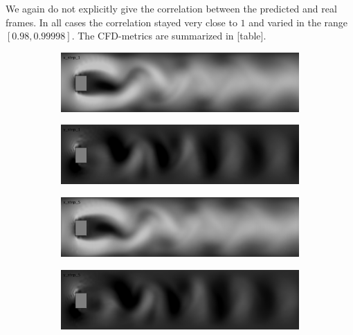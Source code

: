 \documentclass{llncs}
\begin{document}
We again do not explicitly give the correlation between the predicted and real frames. In all cases the correlation stayed very close to $1$ and varied in the range $[0.98, 0.99998]$. The CFD-metrics are summarized in [table].

\begin{figure}[H]
  \begin{subfigure}{.5\textwidth}
    \centering
    \includegraphics[width=1\linewidth]{imgs/sims/constant/x_step_1}  
  \end{subfigure}
  \begin{subfigure}{.5\textwidth}
    \centering
    \includegraphics[width=1\linewidth]{imgs/sims/constant/y_step_1}  
  \end{subfigure}

  \begin{subfigure}{.5\textwidth}
    \centering
    \includegraphics[width=1\linewidth]{imgs/sims/constant/x_step_5}  
  \end{subfigure}
  \begin{subfigure}{.5\textwidth}
    \centering
    \includegraphics[width=1\linewidth]{imgs/sims/constant/y_step_5}  
  \end{subfigure}


\end{figure}
\end{document}
